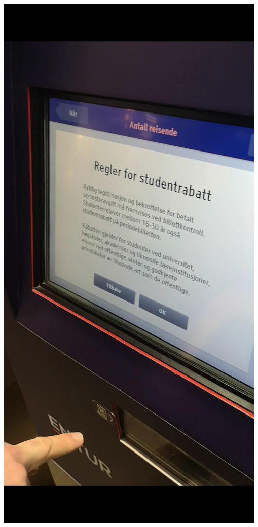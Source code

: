 \documentclass{../../myassignment}
\begin{document}
	\includegraphics[scale=0.25]{pictures2/studentdiscount.jpg}
\end{document}
